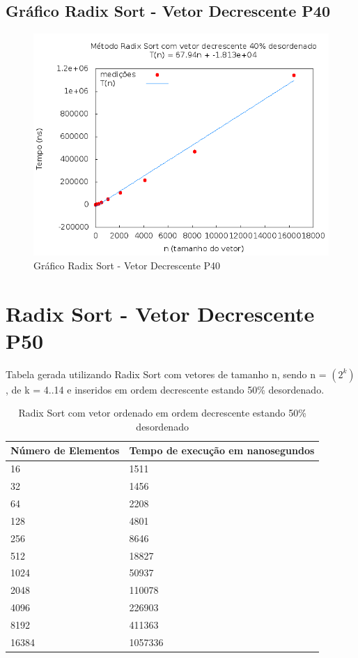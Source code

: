 \documentclass[12pt,a4paper,twoside]{report}
\begin{document}
\subsection{Gráfico Radix Sort - Vetor Decrescente P40}
\begin{figure}[H]
    \centering
    \includegraphics[width=0.7\linewidth]{graficos/RadixSort/vIntDecrescenteP40/vIntDecrescenteP40.png}
  \caption{Gráfico Radix Sort - Vetor Decrescente P40}
\end{figure}

\section{Radix Sort - Vetor Decrescente P50}
Tabela gerada utilizando Radix Sort com vetores de tamanho n, sendo n = $(2^k)$, de k = 4..14 e inseridos em ordem decrescente estando 50\% desordenado.
\begin{table}[H]
\centering
\caption{Radix Sort com vetor ordenado em ordem decrescente estando 50\% desordenado}
\label{my-label}
\begin{tabular}{|l|l|}
\hline
\multicolumn{1}{|c|}{\textbf{Número de Elementos}} & \multicolumn{1}{c|}{\textbf{Tempo de execução em nanosegundos}} \\ \hline
16 & 1511 \\ \hline
32 & 1456 \\ \hline
64 & 2208 \\ \hline
128 & 4801 \\ \hline
256 & 8646 \\ \hline
512 & 18827 \\ \hline
1024 & 50937 \\ \hline
2048 & 110078 \\ \hline
4096 & 226903 \\ \hline
8192 & 411363 \\ \hline
16384 & 1057336 \\ \hline
\end{tabular}
\end{table}
\end{document}
